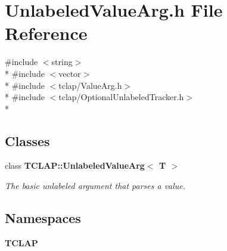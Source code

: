 \section{Unlabeled\+Value\+Arg.\+h File Reference}
\label{UnlabeledValueArg_8h}
{\ttfamily \#include $<$string$>$}\\*
{\ttfamily \#include $<$vector$>$}\\*
{\ttfamily \#include $<$tclap/\+Value\+Arg.\+h$>$}\\*
{\ttfamily \#include $<$tclap/\+Optional\+Unlabeled\+Tracker.\+h$>$}\\*
\subsection*{Classes}
\begin{DoxyCompactItemize}
\item 
class {\bf T\+C\+L\+A\+P\+::\+Unlabeled\+Value\+Arg$<$ T $>$}
\begin{DoxyCompactList}\small\item\em The basic unlabeled argument that parses a value. \end{DoxyCompactList}\end{DoxyCompactItemize}
\subsection*{Namespaces}
\begin{DoxyCompactItemize}
\item 
 {\bf T\+C\+L\+A\+P}
\end{DoxyCompactItemize}
